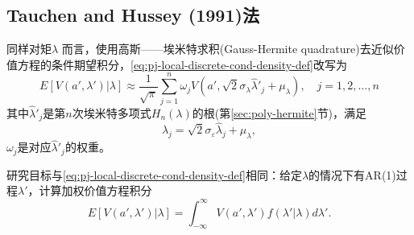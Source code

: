 \begin{subappendices}
\subsection{Tauchen and Hussey (1991)法}
\label{sec:pj-local-discretization-th91}

同样对矩$\lambda$
而言，\cite{Tauchen:1991iv}使用高斯——埃米特求积(Gauss-Hermite quadrature)去近似价值方程的条件期望积分，\eqref{eq:pj-local-discrete-cond-density-def}改写为
\begin{equation}
  \label{eq:pj-local-discrete-cond-density-gauss}
  E \left[ V(a', \lambda') | \lambda \right] \approx \frac{1}{\sqrt{\pi}} \sum_{j=1}^{n} \omega_j V(a', \sqrt{2} \sigma_\lambda \hat{\lambda}'_j + \mu_\lambda), \quad j=1,2,\ldots, n
\end{equation}
其中$ \hat{\lambda}'_j$是第$n$次埃米特多项式$H_n(\lambda)$的根(第\ref{sec:poly-hermite}节)，满足
\begin{equation*}
  \lambda_j = \sqrt{2} \sigma_{\varepsilon} \hat{\lambda}_j + \mu_{\lambda},
\end{equation*}
$\omega_j$是对应$\hat{\lambda}'_j$的权重。

研究目标与\eqref{eq:pj-local-discrete-cond-density-def}相同：给定$\lambda$的情况下有AR(1)过程$\lambda'$，计算加权价值方程积分
\begin{equation*}
  E\left[ V(a', \lambda') | \lambda \right] = \int_{-\infty}^{\infty} V(a',\lambda') f(\lambda' | \lambda) d \lambda'.
\end{equation*}


\end{subappendices}
